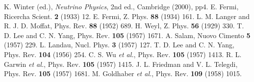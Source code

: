 \begin{thebibliography}{99}
K. Winter (ed.), \emph{Neutrino Physics}, 2nd ed.,
  Cambridge (2000), pp4.
E. Fermi, Ricercha Scient. \textbf{2} (1933) 12.
E. Fermi, Z. Phys. \textbf{88} (1934) 161.
L. M. Langer and R. J. D. Moffat, Phys. Rev.
  \textbf{88} (1952) 689.
H. Weyl, Z. Phys. \textbf{56} (1929) 330.
T. D. Lee and C. N. Yang, Phys. Rev. \textbf{105}
  (1957) 1671.
A. Salam, Nuovo Cimento \textbf{5} (1957) 229.
L. Landau, Nucl. Phys. \textbf{3} (1957) 127.
T. D. Lee and C. N. Yang, Phys. Rev. \textbf{104}
  (1956) 254.
C. S. Wu \textit{et al.}, Phys. Rev. \textbf{105} (1957)
  1413.
R. L. Garwin \textit{et al.}, Phys. Rev. \textbf{105}
  (1957) 1415.
J. L. Friedman and V. L. Telegdi, Phys. Rev.
  \textbf{105} (1957) 1681.
M. Goldhaber \textit{et al.}, Phys. Rev. \textbf{109}
  (1958) 1015.
\end{thebibliography}



